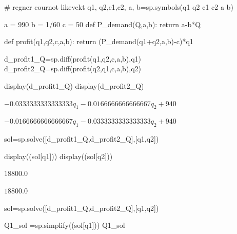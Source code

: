 \documentclass[
  12pt,
  a4paper,
  DIV=11,
  numbers=noendperiod]{scrartcl}
\newenvironment{Shaded}{\begin{snugshade}}{\end{snugshade}}
\newcommand{\CommentTok}[1]{\textcolor[rgb]{0.37,0.37,0.37}{#1}}
\newcommand{\ControlFlowTok}[1]{\textcolor[rgb]{0.00,0.23,0.31}{#1}}
\newcommand{\DecValTok}[1]{\textcolor[rgb]{0.68,0.00,0.00}{#1}}
\newcommand{\KeywordTok}[1]{\textcolor[rgb]{0.00,0.23,0.31}{#1}}
\newcommand{\NormalTok}[1]{\textcolor[rgb]{0.00,0.23,0.31}{#1}}
\newcommand{\OperatorTok}[1]{\textcolor[rgb]{0.37,0.37,0.37}{#1}}
\newcommand{\StringTok}[1]{\textcolor[rgb]{0.13,0.47,0.30}{#1}}
\begin{document}
\begin{Shaded}
\begin{Highlighting}[]
\CommentTok{\# regner cournot likevekt}
\NormalTok{q1, q2,c1,c2, a, b}\OperatorTok{=}\NormalTok{sp.symbols(}\StringTok{\textquotesingle{}q1 q2 c1 c2 a b\textquotesingle{}}\NormalTok{)}

\NormalTok{a }\OperatorTok{=} \DecValTok{990}
\NormalTok{b }\OperatorTok{=} \DecValTok{1}\OperatorTok{/}\DecValTok{60}
\NormalTok{c }\OperatorTok{=} \DecValTok{50}
\KeywordTok{def}\NormalTok{ P\_demand(Q,a,b):}
    \ControlFlowTok{return}\NormalTok{ a}\OperatorTok{{-}}\NormalTok{b}\OperatorTok{*}\NormalTok{Q}

\KeywordTok{def}\NormalTok{ profit(q1,q2,c,a,b):}
    \ControlFlowTok{return}\NormalTok{ (P\_demand(q1}\OperatorTok{+}\NormalTok{q2,a,b)}\OperatorTok{{-}}\NormalTok{c)}\OperatorTok{*}\NormalTok{q1}
\end{Highlighting}
\end{Shaded}

\begin{Shaded}
\begin{Highlighting}[]
\NormalTok{d\_profit1\_Q}\OperatorTok{=}\NormalTok{sp.diff(profit(q1,q2,c,a,b),q1)}
\NormalTok{d\_profit2\_Q}\OperatorTok{=}\NormalTok{sp.diff(profit(q2,q1,c,a,b),q2)}

\NormalTok{display(d\_profit1\_Q)}
\NormalTok{display(d\_profit2\_Q)}
\end{Highlighting}
\end{Shaded}

$\displaystyle - 0.0333333333333333 q_{1} - 0.0166666666666667 q_{2} + 940$

$\displaystyle - 0.0166666666666667 q_{1} - 0.0333333333333333 q_{2} + 940$

\begin{Shaded}
\begin{Highlighting}[]
\NormalTok{sol}\OperatorTok{=}\NormalTok{sp.solve([d\_profit1\_Q,d\_profit2\_Q],[q1,q2])}

\NormalTok{display((sol[q1]))}
\NormalTok{display((sol[q2]))}
\end{Highlighting}
\end{Shaded}

$\displaystyle 18800.0$

$\displaystyle 18800.0$

\begin{Shaded}
\begin{Highlighting}[]
\NormalTok{sol}\OperatorTok{=}\NormalTok{sp.solve([d\_profit1\_Q,d\_profit2\_Q],[q1,q2])}

\NormalTok{Q1\_sol }\OperatorTok{=}\NormalTok{sp.simplify((sol[q1]))}
\NormalTok{Q1\_sol}
\end{Highlighting}
\end{Shaded}
\end{document}
